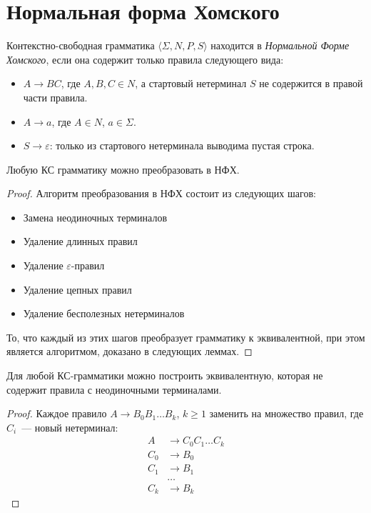 \section{Нормальная форма Хомского}
\label{sec:CNF}

\begin{definition}
    Контекстно-свободная грамматика $\langle \Sigma, N, P, S\rangle$ находится в \emph{Нормальной Форме Хомского}, если она содержит только правила следующего вида:
    \begin{itemize}
        \item $A \to B C$, где $A, B, C \in N$, а стартовый нетерминал $S$ не содержится в правой части правила.
        \item $A \to a$, где $A \in N$, $a \in \Sigma$.
        \item $S \to \varepsilon$: только из стартового нетерминала выводима пустая строка.
    \end{itemize}
\end{definition}

\begin{theorem}
    Любую КС грамматику можно преобразовать в НФХ.
\end{theorem}

\begin{proof}
    Алгоритм преобразования в НФХ состоит из следующих шагов:
    \begin{itemize}
        \item Замена неодиночных терминалов
        \item Удаление длинных правил
        \item Удаление $\varepsilon$-правил
        \item Удаление цепных правил
        \item Удаление бесполезных нетерминалов
    \end{itemize}
    То, что каждый из этих шагов преобразует грамматику к эквивалентной, при этом является алгоритмом, доказано в следующих леммах.
\end{proof}

\begin{lemma}
    Для любой КС-грамматики можно построить эквивалентную, которая не содержит правила с неодиночными терминалами.
\end{lemma}

\begin{proof}
    Каждое правило $A \to B_0 B_1 \dots B_k$, $k \geq 1$ заменить на множество правил, где $C_i$~--- новый нетерминал:
    \begin{align*}
        A   & \to C_0 C_1 \dots C_k \\
        C_0 & \to B_0               \\
        C_1 & \to B_1               \\
            & \dots                 \\
        C_k & \to B_k
    \end{align*}
\end{proof}

